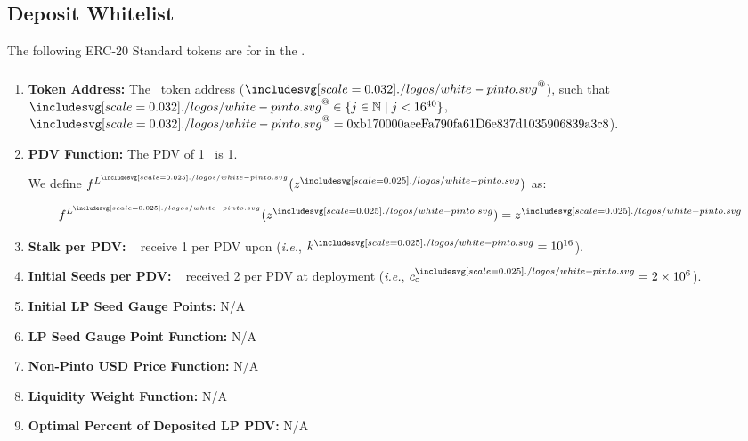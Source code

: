 \documentclass[class=article, crop=false]{standalone}
\begin{document}

\subsection{Deposit Whitelist}

The following ERC-20 Standard tokens are  for  in the .


\vspace{0.2cm}
\subsubsection{\Pinto}
\vspace{0.2cm}

\begin{enumerate}

    \item \textbf{Token Address:} The \Pinto\ token address ($\Pinto^{@}$), such that $\Pinto^{@} \in \{j \in \mathbb{N} \mid j < 16^{40} \}$, $\Pinto^{@} = \\ \text{0xb170000aeeFa790fa61D6e837d1035906839a3c8}$).
    
    \item \textbf{PDV Function:} The PDV of 1 \Pinto\ is 1. 

        We define $f^{L^{\pinto}}(z^{\pinto})$ as:
        
            $$
                f^{L^{\pinto}} (z^{\pinto}) = z^{\pinto}
            $$
        
    \item \textbf{Stalk per PDV:} \Pinto\  receive 1  per PDV upon  (\textit{i.e.}, $k^{\pinto} = 10^{16}$).
    
    \item \textbf{Initial Seeds per PDV:} \Pinto\  received 2  per PDV at deployment (\textit{i.e.}, ${c_{\circ}^{\pinto}} = 2 \times 10^6$).

    \item \textbf{Initial LP Seed Gauge Points:} N/A

    \item \textbf{LP Seed Gauge Point Function:} N/A

    \item \textbf{Non-Pinto USD Price Function:} N/A

    \item \textbf{Liquidity Weight Function:} N/A

    \item \textbf{Optimal Percent of Deposited LP PDV:} N/A
    
\end{enumerate}
\end{document}
